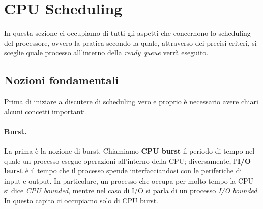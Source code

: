 \pagebreak
\section{CPU Scheduling} \label{CPU scheduling}
In questa sezione ci occupiamo di tutti gli aspetti che concernono lo scheduling del processore, ovvero la pratica secondo la quale, attraverso dei precisi criteri, si sceglie quale processo all'interno della \textit{ready queue} verrà eseguito.

\subsection{Nozioni fondamentali}
Prima di iniziare a discutere di scheduling vero e proprio è necessario avere chiari alcuni concetti importanti.

\paragraph{Burst.}
La prima è la nozione di burst. Chiamiamo \textbf{CPU burst} il periodo di tempo nel quale un processo esegue operazioni all'interno della CPU; diversamente, l'\textbf{I/O burst} è il tempo che il processo spende interfacciandosi con le periferiche di input e output. In particolare, un processo che occupa per molto tempo la CPU si dice \textit{CPU bounded}, mentre nel caso di I/O si parla di un processo \textit{I/O bounded}. In questo capito ci occupiamo solo di CPU burst.
% 
